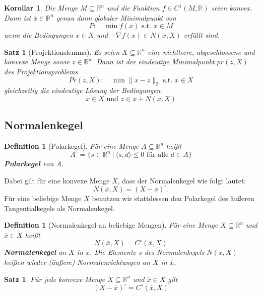 \documentclass[11pt]{scrreprt}
\newcounter{thm}
\theoremstyle{thmstyle}
\numberwithin{thm}{section}
\newtheorem{definition}[thm]{Definition}
\newtheorem{korollar}[thm]{Korollar}
\newtheorem{satz}[thm]{Satz}
\begin{document}
\begin{korollar}
	Die Menge $M \subseteq \mathbb{R}^n$ und die Funktion $f \in C^1(M, \mathbb{R})$ seien konvex. Dann ist $\overline{x} \in \mathbb{R}^n$ genau dann globaler Minimalpunkt von
		$$ P: \quad \min f(x) \text{ s.t. } x \in M $$
	wenn die Bedingungen $\overline{x} \in X$ und $- \nabla f(\overline{x}) \in N(\overline{x}, X)$ erfüllt sind.
\end{korollar} 
 
\begin{satz}[Projektionslemma]
	Es seien $X \subseteq \mathbb{R}^n$ eine nichtleere, abgeschlossene und konvexe Menge sowie $z \in \mathbb{R}^n$. Dann ist der eindeutige Minimalpunkt $pr(z, X)$ des Projektionsproblems
		$$ Pr(z, X): \quad \min \| x - z \|_2 \text{ s.t. } x \in X $$
	gleichzeitig die eindeutige Lösung der Bedingungen
		$$ x \in X \text{ und } z \in x + N(x, X) $$
\end{satz}

\subsection*{Normalenkegel}

\setcounter{thm}{32}

\begin{definition}[Polarkegel]
	 Für eine Menge $A \subseteq \mathbb{R}^n$ heißt
		$$ A^\circ = \big\{ s \in \mathbb{R}^n ~|~\langle s, d \rangle \leq 0 \text{ für alle } d \in A \big\} $$
	\textbf{Polarkegel} von $A$.
\end{definition}

Dabei gilt für eine konvexe Menge $X$, dass der Normalenkegel wie folgt lautet: 
	$$ N(\overline{x}, X) = (X - \overline{x})^\circ. $$
Für eine beliebige Menge $X$ benutzen wir stattdessen den Polarkegel des äußeren Tangentialkegels als Normalenkegel.

\begin{definition}[Normalenkegel an beliebige Mengen]
	Für eine Menge $X \subseteq \mathbb{R}^n$ und $\overline{x} \in X$ heißt
		$$ N(\overline{x}, X) = C^{\circ}(\overline{x}, X) $$
	\textbf{Normalenkegel} an $X$ in $\overline{x}$. Die Elemente $s$ des Normalenkegels $N(\overline{x}, X)$ heißen wieder (äußere) Normalenrichtungen an $X$ in $\overline{x}$. 
\end{definition}
 
\begin{satz}
	Für jede konvexe Menge $X \subseteq \mathbb{R}^n$ und $\overline{x} \in X$ gilt
	$$ (X - \overline{x})^\circ = C^\circ(\overline{x}, X) $$
\end{satz}
\end{document}
